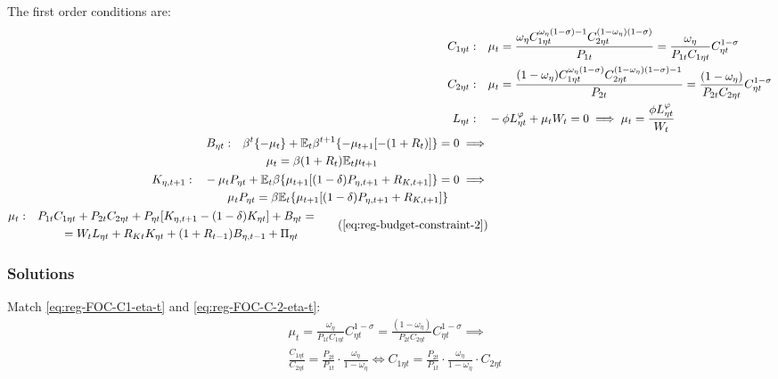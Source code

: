 \documentclass[
thesis.tex
]{subfiles}
\begin{document}
The first order conditions are:
\begin{align}
	C_{1\eta t}: \quad & \mu_t = \frac{\omega_{\eta} C_{1\eta t}^{\omega_{\eta} (1 -\sigma) -1} C_{2\eta t}^{(1 -\omega_{\eta})(1 -\sigma)}}{P_{1t}} = \frac{\omega_{\eta}}{P_{1t} C_{1\eta t}} C_{\eta t}^{1 -\sigma} \label{eq:reg-FOC-C1-eta-t} 
	\\
	C_{2\eta t}: \quad & \mu_t = \frac{(1 -\omega_{\eta}) C_{1\eta t}^{\omega_{\eta} (1 -\sigma)} C_{2\eta t}^{(1 -\omega_{\eta})(1 -\sigma)-1}}{P_{2t}} = \frac{(1 -\omega_{\eta})}{P_{2t} C_{2\eta t}} C_{\eta t}^{1 -\sigma} \label{eq:reg-FOC-C-2-eta-t} 
	\\
	L_{\eta t}: \quad & -\phi L_{\eta t}^{\varphi} +\mu_t W_t = 0 \implies \mu_t = \frac{\phi L_{\eta t}^{\varphi}}{W_t} \label{eq:reg-household-FOC-Lt} 
	\\
	\begin{split}
		B_{\eta t}: \quad & \beta^t \{-\mu_t\} + \E \beta^{t+1} \{ -\mu_{t+1} [-(1 + R_{t})] \} = 0 \implies \\ & \qquad \mu_t = \beta (1 + R_{t}) \E{ \mu_{t+1} }
	\end{split} \label{eq:reg-FOC-Bt}
	\\
	\begin{split}
		K_{\eta, t+1}: \quad & -\mu_t P_{\eta t} + \mathbb{E}_t \beta \{ \mu_{t+1} [(1-\delta) P_{\eta, t+1} + R_{K,t+1}] \} = 0 \implies \\ & \qquad \mu_t P_{\eta t} = \beta \mathbb{E}_t \{ \mu_{t+1} [(1-\delta) P_{\eta, t+1} + R_{K,t+1}] \}
	\end{split} \label{eq:reg-household-FOC-Kt} \\
	\begin{split}
		\mu_t: \quad & P_{1t} C_{1\eta t} + P_{2t} C_{2\eta t} + P_{\eta t} [ K_{\eta, t+1} - (1-\delta)K_{\eta t} ] + B_{\eta t} = \\ & \qquad = W_t L_{\eta t} + R_{Kt} K_{\eta t} + (1 + R_{t-1}) B_{\eta,t-1} + \Pi_{\eta t}
	\end{split} \tag{\ref{eq:reg-budget-constraint-2}}
\end{align}

\subsubsection*{Solutions}

Match \ref{eq:reg-FOC-C1-eta-t} and \ref{eq:reg-FOC-C-2-eta-t}:
\begin{align}
	& \mu_t = \frac{\omega_{\eta}}{P_{1t} C_{1\eta t}} C_{\eta t}^{1 -\sigma} = \frac{(1 -\omega_{\eta})}{P_{2t} C_{2\eta t}} C_{\eta t}^{1 -\sigma} \implies \nonumber \\
	& \frac{C_{1\eta t}}{C_{2\eta t}} = \frac{P_{2t}}{P_{1t}} \cdot \frac{\omega_{\eta}}{1 -\omega_{\eta}} \iff C_{1\eta t} = \frac{P_{2t}}{P_{1t}} \cdot \frac{\omega_{\eta}}{1 -\omega_{\eta}} \cdot C_{2\eta t} \label{eq:reg-FOC-C1-C2}
\end{align}
\end{document}

